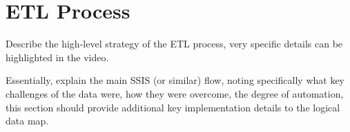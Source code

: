 \section{ETL Process}
\label{sec:ETL}

Describe the high-level strategy of the ETL process, very specific details can be highlighted in the video. 

Essentially, explain the main SSIS (or similar) flow, noting specifically what key challenges of the data were, how they were overcome, the degree of automation, this section should provide additional key implementation details to the logical data map.